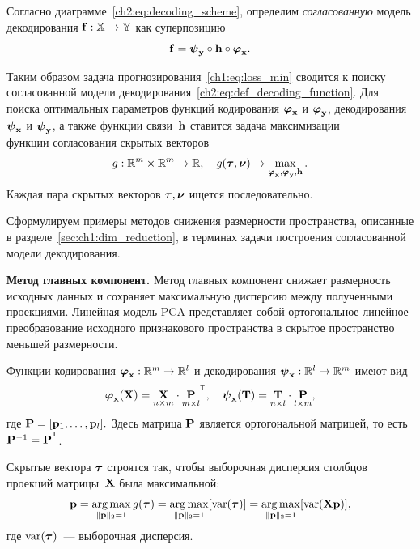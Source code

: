 \documentclass[11pt, a5paper]{dissert}
\begin{document}
\begin{definition}
	Согласно диаграмме~\eqref{ch2:eq:decoding_scheme}, определим \textit{согласованную} модель декодирования $\mathbf{f}: \mathbb{X} \rightarrow \mathbb{Y}$ как суперпозицию
	\begin{equation}
		\mathbf{f} = \boldsymbol{\psi}_{\mathbf{y}} \circ \mathbf{h} \circ \boldsymbol{\varphi}_{\mathbf{x}}.
		\label{ch2:eq:def_decoding_function}
	\end{equation}
\end{definition}

Таким образом задача прогнозирования~\eqref{ch1:eq:loss_min} сводится к поиску согласованной модели декодирования~\eqref{ch2:eq:def_decoding_function}. 
Для поиска оптимальных параметров функций кодирования $\boldsymbol{\varphi}_{\mathbf{x}}$ и $\boldsymbol{\varphi}_{\mathbf{y}}$, декодирования $\boldsymbol{\psi}_{\mathbf{x}}$ и $\boldsymbol{\psi}_{\mathbf{y}}$, а также функции связи~$\mathbf{h}$ ставится задача максимизации $\textit{функции согласования скрытых векторов}$
\[
	g: \mathbb{R}^m \times \mathbb{R}^m \rightarrow \mathbb{R}, \quad g(\boldsymbol{\tau}, \boldsymbol{\nu}) \rightarrow \max_{\boldsymbol{\varphi}_{\mathbf{x}}, \boldsymbol{\varphi}_{\mathbf{y}}, \mathbf{h}}.
\]
Каждая пара скрытых векторов $\boldsymbol{\tau}, \boldsymbol{\nu}$ ищется последовательно.

Сформулируем примеры методов снижения размерности пространства, описанные в разделе~\ref{sec:ch1:dim_reduction}, в терминах задачи построения согласованной модели декодирования.

\textbf{Метод главных компонент.} 
Метод главных компонент снижает размерность исходных данных и сохраняет максимальную дисперсию между полученными проекциями. 
Линейная модель PCA представляет собой ортогональное линейное преобразование исходного признакового пространства в скрытое пространство меньшей размерности. 

Функции кодирования $\boldsymbol{\varphi}_{\mathbf{x}}: \mathbb{R}^m \to \mathbb{R}^l$ и декодирования $\boldsymbol{\psi}_{\mathbf{x}}: \mathbb{R}^l \to \mathbb{R}^m$ имеют вид
\begin{equation*}
	\bphi_{\bx}(\bX) =  \underset{n \times m}\bX \cdot \underset{m \times l}\bP^{\T}, \quad	\bpsi_{\bx}(\bT) =  \underset{n \times l}\bT \cdot \underset{l \times m}\bP,
	\label{ch2:eq:PCA2}
\end{equation*}
где $\mathbf{P} = [\mathbf{p}_1, \dots, \mathbf{p}_l].$ 
Здесь матрица $\mathbf{P}$ является ортогональной матрицей, то есть $\bP^{-1} = \bP^{\T}$.

Скрытые вектора $\boldsymbol{\tau}$ строятся так, чтобы выборочная дисперсия столбцов проекций матрицы~$\mathbf{X}$ была максимальной:
\begin{equation*}
	\mathbf{p} = \mathop{\arg \max}\limits_{\|\mathbf{p}\|_{2} = 1} g(\boldsymbol{\tau}) = \mathop{\arg \max}\limits_{\|\mathbf{p}\|_{2} = 1} [\text{var}(\boldsymbol{\tau})] = \mathop{\arg \max}\limits_{\|\mathbf{p}\|_{2} = 1} [\text{var}(\mathbf{X} \textbf{p})],
\end{equation*}
где $\text{var}(\boldsymbol{\tau})$~--- выборочная дисперсия.
\end{document}
